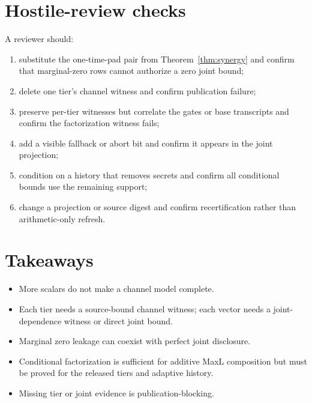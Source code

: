 \documentclass[11pt]{article}
\theoremstyle{definition}
\begin{document}
\section{Hostile-review checks}\label{sec:audit}
A reviewer should:
\begin{enumerate}[leftmargin=*]
\item substitute the one-time-pad pair from Theorem~\ref{thm:synergy} and confirm that marginal-zero rows cannot authorize a zero joint bound;
\item delete one tier's channel witness and confirm publication failure;
\item preserve per-tier witnesses but correlate the gates or base transcripts and confirm the factorization witness fails;
\item add a visible fallback or abort bit and confirm it appears in the joint projection;
\item condition on a history that removes secrets and confirm all conditional bounds use the remaining support;
\item change a projection or source digest and confirm recertification rather than arithmetic-only refresh.
\end{enumerate}

\section{Takeaways}
\begin{itemize}[leftmargin=*]
\item More scalars do not make a channel model complete.
\item Each tier needs a source-bound channel witness; each vector needs a joint-dependence witness or direct joint bound.
\item Marginal zero leakage can coexist with perfect joint disclosure.
\item Conditional factorization is sufficient for additive MaxL composition but must be proved for the released tiers and adaptive history.
\item Missing tier or joint evidence is publication-blocking.
\end{itemize}
\end{document}
